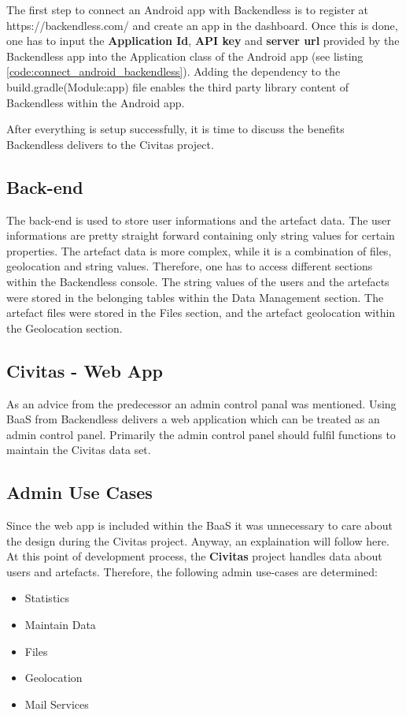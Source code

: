 The first step to connect an Android app with Backendless is to register at https://backendless.com/ and create an app in the dashboard. Once this is done, one has to input the \textbf{Application Id}, \textbf{API key} and \textbf{server url} provided by the Backendless app into the Application class of the Android app (see listing \ref{code:connect_android_backendless}). Adding the dependency to the build.gradle(Module:app) file enables the third party library content of Backendless within the Android app.

\fbox{

}

After everything is setup successfully, it is time to discuss the benefits Backendless delivers to the Civitas project.

\subsection{Back-end}
The back-end is used to store user informations and the artefact data. The user informations are pretty straight forward containing only string values for certain properties. The artefact data is more complex, while it is a combination of files, geolocation and string values. Therefore, one has to access different sections within the Backendless console. The string values of the users and the artefacts were stored in the belonging tables within the Data Management section. The artefact files were stored in the Files section, and the artefact geolocation within the Geolocation section.



\subsection{Civitas - Web App}
As an advice from the predecessor an admin control panal was mentioned. Using BaaS from Backendless delivers a web application which can be treated as an admin control panel. Primarily the admin control panel should fulfil functions to maintain the Civitas data set. 

\subsection{Admin Use Cases}

Since the web app is included within the BaaS it was unnecessary to care about the design during the Civitas project. Anyway, an explaination will follow here.
At this point of development process, the \textbf{Civitas} project handles data about users and artefacts. Therefore, the following admin use-cases are determined:
\begin{itemize}
\item Statistics
\item Maintain Data
\item Files
\item Geolocation
\item Mail Services
\end{itemize}

